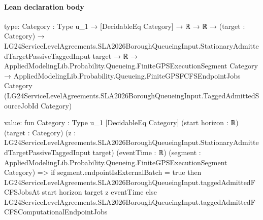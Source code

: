 \documentclass[10pt]{article}
\begin{document}
\paragraph{Lean declaration body}
\begin{ReviewVerbatim}
type:
{Category : Type u_1} →
  [DecidableEq Category] →
    ℝ →
      ℝ →
        (target : Category) →
          LG24ServiceLevelAgreements.SLA2026BoroughQueueingInput.StationaryAdmittedTargetPassiveTaggedInput target →
            ℝ →
              AppliedModelingLib.Probability.Queueing.FiniteGPSExecutionSegment Category →
                AppliedModelingLib.Probability.Queueing.FiniteGPSFCFSEndpointJobs Category
                  (LG24ServiceLevelAgreements.SLA2026BoroughQueueingInput.TaggedAdmittedSourceJobId Category)

value:
fun {Category : Type u_1} [DecidableEq Category] (start horizon : ℝ) (target : Category)
    (z : LG24ServiceLevelAgreements.SLA2026BoroughQueueingInput.StationaryAdmittedTargetPassiveTaggedInput target)
    (eventTime : ℝ) (segment : AppliedModelingLib.Probability.Queueing.FiniteGPSExecutionSegment Category) =>
  if segment.endpointIsExternalBatch = true then
    LG24ServiceLevelAgreements.SLA2026BoroughQueueingInput.taggedAdmittedFCFSJobsAt start horizon target z eventTime
  else LG24ServiceLevelAgreements.SLA2026BoroughQueueingInput.taggedAdmittedFCFSComputationalEndpointJobs
\end{ReviewVerbatim}
\end{document}
